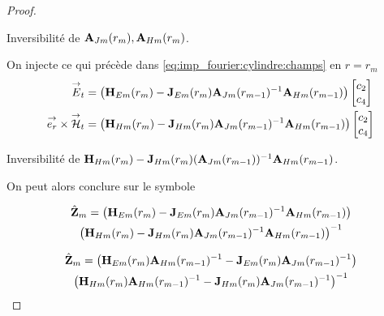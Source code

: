 \begin{proof}
            \begin{TODO}
  Inversibilité de \(\mathbf{A}_{Jm}(r_m), \mathbf{A}_{Hm}(r_m)\).
\end{TODO}

            On injecte ce qui précède dans \eqref{eq:imp_fourier:cylindre:champs} en \(r = r_{m}\)
            \begin{align}
                {\overset{\rightarrow}{E}}_t &= 
                \left(\mathbf{H}_{Em}(r_{m}) - \mathbf{J}_{Em}(r_{m})\mathbf{A}_{Jm}(r_{m-1})^{-1}\mathbf{A}_{Hm}(r_{m-1})\right)
                \begin{bmatrix}
                    c_2 \\
                    c_4
                \end{bmatrix}
                \\
                {\overset{\rightarrow}{e_r}}\times{\overset{\rightarrow}{\mathcal{H}}}_t &= 
                \left(\mathbf{H}_{Hm}(r_{m}) - \mathbf{J}_{Hm}(r_{m})\mathbf{A}_{Jm}(r_{m-1})^{-1}\mathbf{A}_{Hm}(r_{m-1}) \right)
                \begin{bmatrix}
                    c_2 \\
                    c_4
                \end{bmatrix}
            \end{align}

            \begin{TODO}
  Inversibilité de \(\mathbf{H}_{Hm}(r_m) - \mathbf{J}_{Hm}(r_m)(\mathbf{A}_{Jm}(r_{m-1}))^{-1}\mathbf{A}_{Hm}(r_{m-1})\).
\end{TODO}

            On peut alors conclure sur le symbole

            \begin{multline}
                \hat {\mathbf{Z}}_{m} = 
                    \left(\mathbf{H}_{Em}(r_m) - \mathbf{J}_{Em}(r_m)\mathbf{A}_{Jm}(r_{m-1})^{-1}\mathbf{A}_{Hm}(r_{m-1})\right) \\
                    \left(\mathbf{H}_{Hm}(r_m) - \mathbf{J}_{Hm}(r_m)\mathbf{A}_{Jm}(r_{m-1})^{-1}\mathbf{A}_{Hm}(r_{m-1})\right)^{-1}
            \end{multline}

            \begin{multline}
                \hat {\mathbf{Z}}_{m} =
                    \left(\mathbf{H}_{Em}(r_m)\mathbf{A}_{Hm}(r_{m-1})^{-1} - \mathbf{J}_{Em}(r_m)\mathbf{A}_{Jm}(r_{m-1})^{-1}\right) \\
                    \left(\mathbf{H}_{Hm}(r_m)\mathbf{A}_{Hm}(r_{m-1})^{-1} - \mathbf{J}_{Hm}(r_m)\mathbf{A}_{Jm}(r_{m-1})^{-1}\right)^{-1}
            \end{multline}

        \end{proof}

